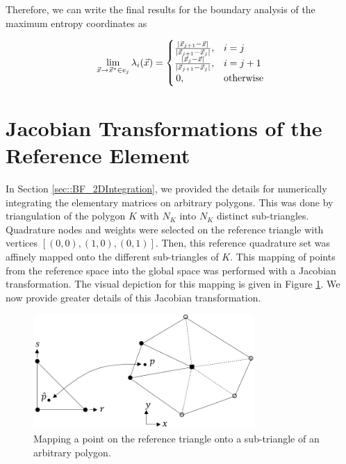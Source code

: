 \noindent Therefore, we can write the final results for the boundary analysis of the maximum entropy coordinates as 

\begin{equation}
\label{eq::App_BF_MV_faceFINAL}
\lim\displaylimits_{\vec{x} \rightarrow \vec{x}^* \in e_j} \lambda_i (\vec{x}) = 
\begin{cases}
\frac{| \vec{x}_{j+1} - \vec{x} |}{| \vec{x}_{j+1} - \vec{x}_{j} |},&i=j\\
\frac{| \vec{x}_{j} - \vec{x} |}{| \vec{x}_{j+1} - \vec{x}_{j} |},&i=j+1\\
\,0,&\text{otherwise}
\end{cases}
\end{equation} 

\section{Jacobian Transformations of the Reference Element}
\label{sec::appendix_BF_Jac}

In Section \ref{sec::BF_2DIntegration}, we provided the details for numerically integrating the elementary matrices on arbitrary polygons. This was done by triangulation of the polygon $K$ with $N_K$ into $N_K$ distinct sub-triangles. Quadrature nodes and weights were selected on the reference triangle with vertices $\left[  (0,0),(1,0),(0,1) \right]$. Then, this reference quadrature set was affinely mapped onto the different sub-triangles of $K$. This mapping of points from the reference space into the global space was performed with a Jacobian transformation. The visual depiction for this mapping is given in Figure \ref{fig::App_BF_2D_tri_mapping}. We now provide greater details of this Jacobian transformation.

\begin{figure}
\centering
\includegraphics[width=0.75\textwidth]{figures/appendices/triangle_mapping_Rev1.png}
\caption{Mapping a point on the reference triangle onto a sub-triangle of an arbitrary polygon.}
\label{fig::App_BF_2D_tri_mapping}
\end{figure}

